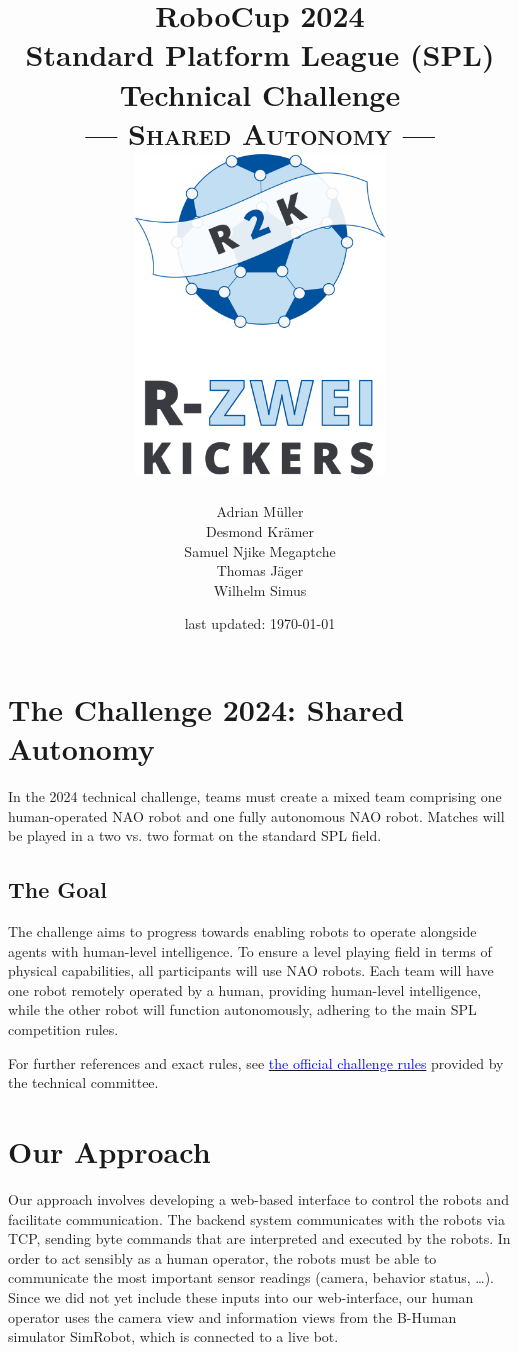 \documentclass[a4paper]{article}
\title{RoboCup 2024 \\ Standard Platform League (SPL) \\ Technical Challenge \\ --- \textsc{Shared Autonomy} --- \\\vspace{2cm} \includegraphics[width=0.5\textwidth]{img/R2K_Logo}}
\date{last updated: \today}
\author{Adrian Müller \\ Desmond Krämer \\ Samuel Njike Megaptche \\ Thomas Jäger \\ Wilhelm Simus}
\begin{document}
	\setlength{\parindent}{0pt}
	\pagestyle{empty}
	\maketitle
	\newpage
	\pagestyle{headings}

\section{The Challenge 2024: Shared Autonomy}

In the 2024 technical challenge, teams must create a mixed team comprising one human-operated NAO robot and one 
fully autonomous NAO robot. Matches will be played in a two vs. two format on the standard SPL field.

\subsection{The Goal}

The challenge aims to progress towards enabling robots to operate alongside agents with human-level intelligence. 
To ensure a level playing field in terms of physical capabilities, all participants will use NAO robots. 
Each team will have one robot remotely operated by a human, providing human-level intelligence, 
while the other robot will function autonomously, adhering to the main SPL competition rules.

For further references and exact rules, see 
\href{https://spl.robocup.org/wp-content/uploads/SPL-Challenges-2024.pdf}{\textcolor{blue}{the official challenge rules}} 
provided by the technical committee.

\section{Our Approach}

Our approach involves developing a web-based interface to control the robots and facilitate communication. 
The backend system communicates with the robots via TCP, sending byte commands that are interpreted and executed by the robots.
In order to act sensibly as a human operator, the robots must be able to communicate the most important sensor readings (camera, behavior status, \dots).
Since we did not yet include these inputs into our web-interface, our human operator uses the camera view and information views from the B-Human simulator SimRobot, which is connected to a live bot.

\vspace{7.5mm}
\end{document}

